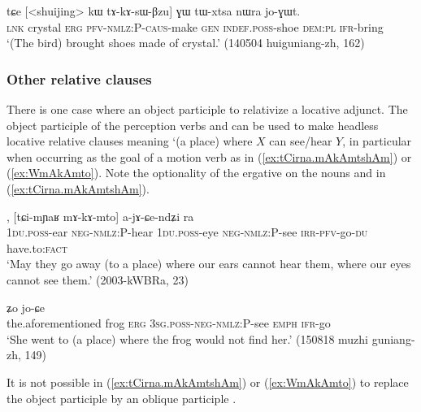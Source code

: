 \begin{exe}
\ex \label{ex:tAkAsWBzu.GW.tWxtsa}
\gll  tɕe [<shuijing> kɯ tɤ-kɤ-sɯ-βzu] ɣɯ tɯ-xtsa nɯra jo-ɣɯt. \\
\textsc{lnk} crystal \textsc{erg} \textsc{pfv}-\textsc{nmlz}:P-\textsc{caus}-make \textsc{gen} \textsc{indef}.\textsc{poss}-shoe \textsc{dem}:\textsc{pl} \textsc{ifr}-bring \\
\glt `(The bird) brought shoes made of crystal.' (140504 huiguniang-zh, 162)
\end{exe}

\subsubsection{Other relative clauses}  \label{sec:object.participle.other.relative}
There is one case where an object participle to relativize a locative adjunct. The object participle of the perception verbs  and  can be used to make headless locative relative clauses meaning `(a place) where $X$ can see/hear $Y$, in particular when occurring as the goal of a motion verb as in (\ref{ex:tCirna.mAkAmtshAm}) or (\ref{ex:WmAkAmto}). Note the optionality of the ergative on the nouns  and  in (\ref{ex:tCirna.mAkAmtshAm}). 

\begin{exe}
\ex \label{ex:tCirna.mAkAmtshAm}
, [tɕi-mɲaʁ mɤ-kɤ-mto] a-jɤ-ɕe-ndʑi ra \\
\textsc{1du}.\textsc{poss}-ear \textsc{neg}-\textsc{nmlz}:P-hear \textsc{1du}.\textsc{poss}-eye \textsc{neg}-\textsc{nmlz}:P-see \textsc{irr}-\textsc{pfv}-go-\textsc{du} have.to:\textsc{fact} \\
\glt  `May they go away (to a place) where our ears cannot hear them, where our eyes cannot see them.' (2003-kWBRa, 23)
\end{exe}

\begin{exe}
\ex \label{ex:WmAkAmto}
 ʑo jo-ɕe  \\
the.aforementioned frog \textsc{erg} \textsc{3sg}.\textsc{poss}-\textsc{neg}-\textsc{nmlz}:P-see \textsc{emph} \textsc{ifr}-go   \\
\glt `She went to (a place) where the frog would not find her.' (150818 muzhi guniang-zh, 149)
\end{exe}

It is not possible in (\ref{ex:tCirna.mAkAmtshAm}) or (\ref{ex:WmAkAmto}) to replace the object participle by an oblique participle .

